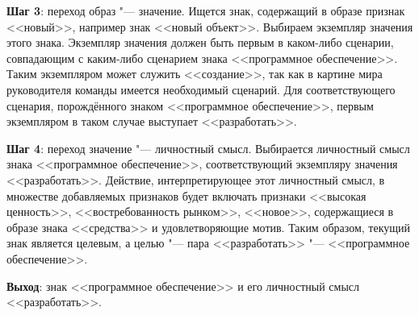 \textbf{Шаг 3}: переход образ "--- значение. Ищется знак, содержащий в образе признак <<новый>>, например знак <<новый объект>>. Выбираем экземпляр значения этого знака. Экземпляр значения должен быть первым в каком-либо сценарии, совпадающим с каким-либо сценарием знака <<программное обеспечение>>. Таким экземпляром может служить <<создание>>, так как в картине мира руководителя команды имеется необходимый сценарий. Для соответствующего сценария, порождённого знаком <<программное обеспечение>>, первым экземпляром в таком случае выступает <<разработать>>.

\textbf{Шаг 4}: переход значение "--- личностный смысл. Выбирается личностный смысл знака <<программное обеспечение>>, соответствующий экземпляру значения <<разработать>>. Действие, интерпретирующее этот личностный смысл, в множестве добавляемых признаков будет включать признаки <<высокая ценность>>, <<востребованность рынком>>, <<новое>>, содержащиеся в образе знака <<средства>> и удовлетворяющие мотив. Таким образом, текущий знак является целевым, а целью "--- пара <<разработать>> "--- <<программное обеспечение>>.

\textbf{Выход}: знак <<программное обеспечение>> и его личностный смысл <<разработать>>.